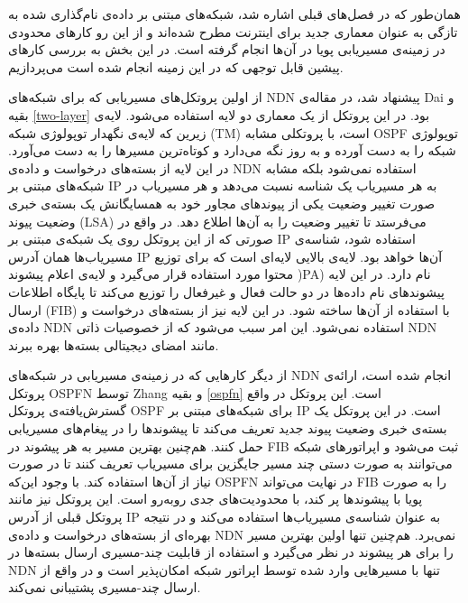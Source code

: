 

همان‌طور که در فصل‌های قبلی اشاره شد، شبکه‌های مبتنی بر داده‌ی نام‌گذاری شده به تازگی به عنوان معماری جدید برای اینترنت مطرح شده‌اند و از این رو کارهای محدودی در زمینه‌ی مسیریابی پویا در آن‌ها انجام گرفته است. در این بخش به بررسی کارهای پیشین قابل توجهی که در این زمینه انجام شده است می‌پردازیم.

از اولین پروتکل‌های مسیریابی که برای شبکه‌های NDN پیشنهاد شد، در مقاله‌ی Dai و بقیه \ref{two-layer} بود. در این پروتکل از یک معماری دو لایه استفاده می‌شود. لایه‌ی زیرین که لایه‌ی نگهدار توپولوژی شبکه  (TM) است، با پروتکلی مشابه OSPF توپولوژی شبکه را به دست آورده و به روز نگه می‌دارد و کوتاه‌ترین مسیرها را به دست می‌آورد. در این لایه از بسته‌های درخواست و داده‌ی NDN استفاده نمی‌شود بلکه مشابه شبکه‌های مبتنی بر IP به هر مسیریاب یک شناسه نسبت می‌دهد و هر مسیریاب در صورت تغییر وضعیت یکی از پیوند‌‌های مجاور خود به همسایگانش یک بسته‌ی خبری وضعیت پیوند  (LSA) می‌فرستد تا تغییر وضعیت را به آن‌ها اطلاع دهد. در واقع در صورتی که از این پروتکل روی یک شبکه‌ی مبتنی بر IP استفاده شود، شناسه‌ی مسیریاب‌ها همان آدرس IP آن‌ها خواهد بود. لایه‌ی بالایی لایه‌ای است که برای توزیع محتوا مورد استفاده قرار می‌گیرد و لایه‌ی اعلام پیشوند   )PA) نام دارد. در این لایه پیشوند‌های نام داده‌ها در دو حالت فعال و غیرفعال را توزیع می‌کند تا پایگاه اطلاعات ارسال (FIB) با استفاده از آن‌ها ساخته شود. در این لایه نیز از بسته‌های درخواست و داده‌ی NDN استفاده نمی‌شود. این امر سبب می‌شود که از خصوصیات ذاتی NDN مانند امضای دیجیتالی بسته‌ها بهره ببرند.

از دیگر کارهایی که در زمینه‌ی مسیریابی در شبکه‌های NDN انجام شده است، ارائه‌ی پروتکل OSPFN توسط Zhang و بقیه \ref{ospfn} است. این پروتکل در واقع گسترش‌یافته‌ی پروتکل OSPF برای شبکه‌های مبتنی بر IP است. در این پروتکل یک بسته‌ی خبری وضعیت پیوند جدید تعریف می‌کند تا پیشوند‌ها را در پیغام‌های مسیریابی حمل کنند. هم‌چنین بهترین مسیر به هر پیشوند در FIB ثبت می‌شود و اپراتورهای شبکه می‌توانند به صورت دستی چند مسیر جایگزین برای مسیریاب تعریف کنند تا در صورت نیاز از آن‌ها استفاده کند. با وجود این‌که OSPFN در نهایت می‌تواند FIB را به صورت پویا با پیشوندها پر کند، با محدودیت‌های جدی روبه‌رو است. این پروتکل نیز مانند پروتکل قبلی از آدرس IP به عنوان شناسه‌ی مسیریاب‌ها استفاده می‌کند و در نتیجه بهره‌ای از بسته‌های درخواست و داده‌ی NDN نمی‌برد. هم‌چنین تنها اولین بهترین مسیر را برای هر پیشوند در نظر می‌گیرد و استفاده از قابلیت چند-مسیری ارسال بسته‌ها در NDN تنها با مسیرهایی وارد شده توسط اپراتور شبکه امکان‌پذیر است و در واقع از ارسال چند-مسیری پشتیبانی نمی‌کند.

